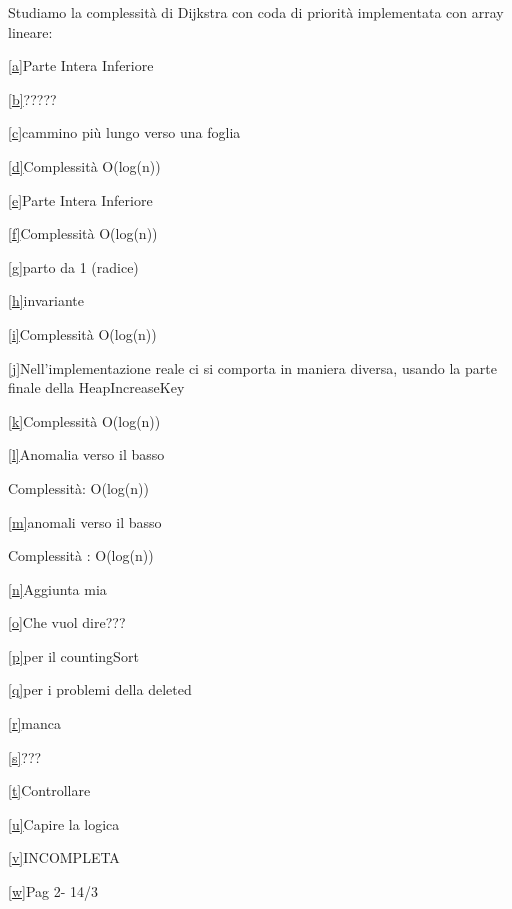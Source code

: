 \documentclass{article}
\begin{document}
{{{{Studiamo la complessità di Dijkstra con coda di priorità implementata con array lineare:}




\protect\hyperlink{cmnt_ref1}{{[}a{]}}{Parte Intera Inferiore}

\protect\hyperlink{cmnt_ref2}{{[}b{]}}{?????}

\protect\hyperlink{cmnt_ref3}{{[}c{]}}{cammino più lungo verso una
foglia}

\protect\hyperlink{cmnt_ref4}{{[}d{]}}{Complessità O(log(n))}

\protect\hyperlink{cmnt_ref5}{{[}e{]}}{Parte Intera Inferiore}

\protect\hyperlink{cmnt_ref6}{{[}f{]}}{Complessità O(log(n))}

\protect\hyperlink{cmnt_ref7}{{[}g{]}}{parto da 1 (radice)}

\protect\hyperlink{cmnt_ref8}{{[}h{]}}{invariante}

\protect\hyperlink{cmnt_ref9}{{[}i{]}}{Complessità O(log(n))}

\protect\hyperlink{cmnt_ref10}{{[}j{]}}{Nell'implementazione reale ci si
comporta in maniera diversa, usando la parte finale della
HeapIncreaseKey}

\protect\hyperlink{cmnt_ref11}{{[}k{]}}{Complessità O(log(n))}

\protect\hyperlink{cmnt_ref12}{{[}l{]}}{Anomalia verso il basso}

{Complessità: O(log(n))}

\protect\hyperlink{cmnt_ref13}{{[}m{]}}{anomali verso il basso}

{Complessità : O(log(n))}

\protect\hyperlink{cmnt_ref14}{{[}n{]}}{Aggiunta mia}

\protect\hyperlink{cmnt_ref15}{{[}o{]}}{Che vuol dire???}

\protect\hyperlink{cmnt_ref16}{{[}p{]}}{per il countingSort}

\protect\hyperlink{cmnt_ref17}{{[}q{]}}{per i problemi della deleted}

\protect\hyperlink{cmnt_ref18}{{[}r{]}}{manca}

\protect\hyperlink{cmnt_ref19}{{[}s{]}}{???}

\protect\hyperlink{cmnt_ref20}{{[}t{]}}{Controllare}

\protect\hyperlink{cmnt_ref21}{{[}u{]}}{Capire la logica}

\protect\hyperlink{cmnt_ref22}{{[}v{]}}{INCOMPLETA}

\protect\hyperlink{cmnt_ref23}{{[}w{]}}{Pag 2- 14/3}

}}}
\end{document}
